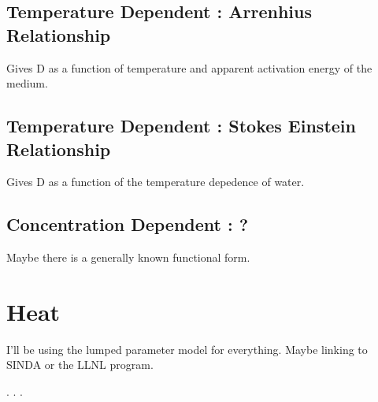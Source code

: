 \subsection{ Temperature Dependent : Arrenhius Relationship }

Gives D as a function of temperature and apparent activation energy of the 
medium.

\subsection{ Temperature Dependent : Stokes Einstein Relationship }

Gives D as a function of the temperature depedence of water.

\subsection{ Concentration Dependent : ? }

Maybe there is a generally known functional form.


\section{Heat}

I'll be using the lumped parameter model for everything. Maybe linking to SINDA 
or the LLNL program. 
 

. . . 

